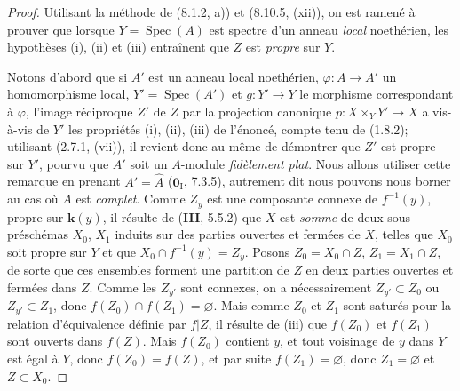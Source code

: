 \begin{proof}
Utilisant la méthode de (8.1.2, a)) et (8.10.5, (xii)), on est ramené à prouver que lorsque $Y=\operatorname{Spec}(A)$ est spectre d'un anneau \emph{local} noethérien, les hypothèses (i), (ii) et (iii) entraînent que $Z$ est \emph{propre} sur $Y$.

Notons d'abord que si $A'$ est un anneau local noethérien, $\varphi:A\to A'$ un homomorphisme local, $Y'=\operatorname{Spec}(A')$ et $g:Y'\to Y$ le morphisme correspondant à $\varphi$, l'image réciproque $Z'$ de $Z$ par la projection canonique $p:X\times_Y Y'\to X$ a vis-à-vis de $Y'$ les propriétés (i), (ii), (iii) de l'énoncé, compte tenu de (1.8.2); utilisant (2.7.1, (vii)), il revient donc au même de démontrer que $Z'$ est propre sur $Y'$, pourvu que $A'$ soit un $A$-module \emph{fidèlement plat}. Nous allons utiliser cette remarque en prenant $A'=\widehat A$ ($\mathbf{0}_{\mathrm{I}}$, 7.3.5), autrement dit nous pouvons nous borner au cas où $A$ est \emph{complet}. Comme $Z_y$ est une composante connexe de $f^{-1}(y)$, propre sur $\mathbf k(y)$, il résulte de (\textbf{III}, 5.5.2) que $X$ est \emph{somme} de deux sous-préschémas $X_0$, $X_1$ induits sur des parties ouvertes et fermées de $X$, telles que $X_0$ soit propre sur $Y$ et que $X_0\cap f^{-1}(y)=Z_y$. Posons $Z_0=X_0\cap Z$, $Z_1=X_1\cap Z$, de sorte que ces ensembles forment une partition de $Z$ en deux parties ouvertes et fermées dans $Z$. Comme les $Z_{y'}$ sont connexes, on a nécessairement $Z_{y'}\subset Z_0$ ou $Z_{y'}\subset Z_1$, donc $f(Z_0)\cap f(Z_1)=\varnothing$. Mais comme $Z_0$ et $Z_1$ sont saturés pour la relation d'équivalence définie par $f|Z$, il résulte de (iii) que $f(Z_0)$ et $f(Z_1)$ sont ouverts dans $f(Z)$. Mais $f(Z_0)$ contient $y$, et tout voisinage de $y$ dans $Y$ est égal à $Y$, donc $f(Z_0)=f(Z)$, et par suite $f(Z_1)=\varnothing$, donc $Z_1=\varnothing$ et $Z\subset X_0$.


\end{proof}
